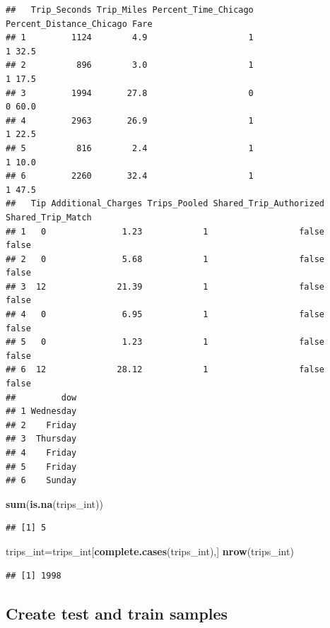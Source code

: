 \documentclass[
]{article}
\newenvironment{Shaded}{\begin{snugshade}}{\end{snugshade}}
\newcommand{\FunctionTok}[1]{\textcolor[rgb]{0.13,0.29,0.53}{\textbf{#1}}}
\newcommand{\NormalTok}[1]{#1}
\newcommand{\OtherTok}[1]{\textcolor[rgb]{0.56,0.35,0.01}{#1}}
\begin{document}
\begin{verbatim}
##   Trip_Seconds Trip_Miles Percent_Time_Chicago Percent_Distance_Chicago Fare
## 1         1124        4.9                    1                        1 32.5
## 2          896        3.0                    1                        1 17.5
## 3         1994       27.8                    0                        0 60.0
## 4         2963       26.9                    1                        1 22.5
## 5          816        2.4                    1                        1 10.0
## 6         2260       32.4                    1                        1 47.5
##   Tip Additional_Charges Trips_Pooled Shared_Trip_Authorized Shared_Trip_Match
## 1   0               1.23            1                  false             false
## 2   0               5.68            1                  false             false
## 3  12              21.39            1                  false             false
## 4   0               6.95            1                  false             false
## 5   0               1.23            1                  false             false
## 6  12              28.12            1                  false             false
##         dow
## 1 Wednesday
## 2    Friday
## 3  Thursday
## 4    Friday
## 5    Friday
## 6    Sunday
\end{verbatim}

\begin{Shaded}
\begin{Highlighting}[]
\FunctionTok{sum}\NormalTok{(}\FunctionTok{is.na}\NormalTok{(trips\_int))}
\end{Highlighting}
\end{Shaded}

\begin{verbatim}
## [1] 5
\end{verbatim}

\begin{Shaded}
\begin{Highlighting}[]
\NormalTok{trips\_int}\OtherTok{=}\NormalTok{trips\_int[}\FunctionTok{complete.cases}\NormalTok{(trips\_int),]}
\FunctionTok{nrow}\NormalTok{(trips\_int)}
\end{Highlighting}
\end{Shaded}

\begin{verbatim}
## [1] 1998
\end{verbatim}

\subsection{Create test and train
samples}\label{create-test-and-train-samples}
\end{document}
